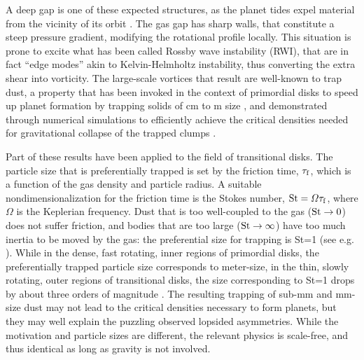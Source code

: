 \documentclass[apj]{emulateapj}
\newcommand{\tauf}{\tau_{\rm f}}
\newcommand{\St}{{\rm St}}
\begin{document}
A deep gap is one of these expected structures, as the planet tides expel material from the vicinity of its orbit 
\citep{Papaloizou-Lin84,Lin-Papaloizou86a,Lin-Papaloizou86b,Nelson00,Masset-Snellgrove01,Paardekooper-Mellema04,Quillen04,deValBorro06,Klahr-Kley06,Lyra09a,Zhu11,Kley12}. 
The gas gap has sharp walls, that constitute a steep pressure gradient, modifying the rotational profile locally. 
This situation is prone to excite what has been called Rossby wave
instability (RWI), that are in fact  ``edge modes'' 
\citep{Lovelace-Hohlfeld78,Toomre81,Papaloizou-Pringle84,Papaloizou-Pringle85,Hawley87,Lovelace99,Varniere-Tagger06,deValBorro07,Lyra08,Lyra09a,Lyra09b,
Meheut10,Meheut12a,Meheut12b,Meheut12c,Lin-Papaloizou11a,Lin-Papaloizou11b,Lin-Papaloizou12,Lyra-MacLow12,Lin12,Lin13} 
akin to Kelvin-Helmholtz instability, thus converting the extra shear
into vorticity. The large-scale vortices that result are well-known to trap 
dust, a property that has been invoked in the context of primordial disks to
speed up planet formation by trapping solids of cm to m size \citep{Barge-Sommeria95,Adams-Watkins95,Tanga96,Klahr-Henning97,Hodgson-Brandenburg98,Chavanis00,delaFuenteMarcos-Barge01,Johansen04,Inaba-Barge06}, and demonstrated through numerical simulations to efficiently achieve the
critical densities needed for gravitational collapse of the
trapped clumps \citep{Lyra08,Lyra09a,Lyra09b}. 

Part of these results have been applied to the field of
transitional disks. The particle size that is
preferentially trapped is set by the friction time, $\tauf$, which is a
function of the gas density and particle radius. A suitable nondimensionalization for the
friction time is the Stokes number, $\St = \varOmega \tauf$,
where $\varOmega$ is the Keplerian frequency. Dust that is too
well-coupled to the gas ($\St\rightarrow 0$) does not suffer friction, and bodies
that are too large ($\St\rightarrow \infty$) have too much inertia to be moved by the
gas: the preferential size for trapping is \St=1 (see e.g. \citealt{Youdin-Goodman05,Youdin08}).
While in the dense, fast rotating, inner regions of primordial disks, 
the preferentially trapped particle size corresponds to meter-size, in
the thin, slowly rotating, outer regions of transitional
disks, the size corresponding to \St=1 drops by about three orders of
magnitude \citep{Brauer07,Pinilla12a}. The resulting trapping of sub-mm and mm-size dust may not
lead to the critical densities necessary to form planets, but they may
well explain the puzzling observed lopsided asymmetries. While the 
motivation and particle sizes are different, the relevant physics 
is scale-free, and thus identical as long as gravity is not involved. 
\end{document}

